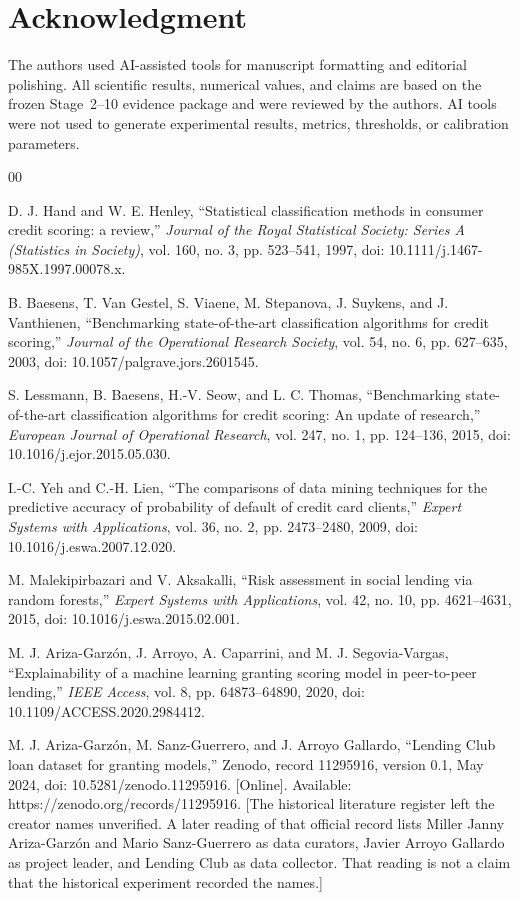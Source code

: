 \documentclass{ieeeaccess}
\begin{document}
\section*{Acknowledgment}
The authors used AI-assisted tools for manuscript formatting and editorial polishing.
All scientific results, numerical values, and claims are based on the frozen Stage~2--10 evidence package and were reviewed by the authors.
AI tools were not used to generate experimental results, metrics, thresholds, or calibration parameters.

\begin{thebibliography}{00}

 D. J. Hand and W. E. Henley, ``Statistical classification methods in consumer credit scoring: a review,'' \emph{Journal of the Royal Statistical Society: Series A (Statistics in Society)}, vol. 160, no. 3, pp. 523--541, 1997, doi: 10.1111/j.1467-985X.1997.00078.x.

 B. Baesens, T. Van Gestel, S. Viaene, M. Stepanova, J. Suykens, and J. Vanthienen, ``Benchmarking state-of-the-art classification algorithms for credit scoring,'' \emph{Journal of the Operational Research Society}, vol. 54, no. 6, pp. 627--635, 2003, doi: 10.1057/palgrave.jors.2601545.

 S. Lessmann, B. Baesens, H.-V. Seow, and L. C. Thomas, ``Benchmarking state-of-the-art classification algorithms for credit scoring: An update of research,'' \emph{European Journal of Operational Research}, vol. 247, no. 1, pp. 124--136, 2015, doi: 10.1016/j.ejor.2015.05.030.

 I.-C. Yeh and C.-H. Lien, ``The comparisons of data mining techniques for the predictive accuracy of probability of default of credit card clients,'' \emph{Expert Systems with Applications}, vol. 36, no. 2, pp. 2473--2480, 2009, doi: 10.1016/j.eswa.2007.12.020.

 M. Malekipirbazari and V. Aksakalli, ``Risk assessment in social lending via random forests,'' \emph{Expert Systems with Applications}, vol. 42, no. 10, pp. 4621--4631, 2015, doi: 10.1016/j.eswa.2015.02.001.

 M. J. Ariza-Garzón, J. Arroyo, A. Caparrini, and M. J. Segovia-Vargas, ``Explainability of a machine learning granting scoring model in peer-to-peer lending,'' \emph{IEEE Access}, vol. 8, pp. 64873--64890, 2020, doi: 10.1109/ACCESS.2020.2984412.

 M. J. Ariza-Garz\'on, M. Sanz-Guerrero, and J. Arroyo Gallardo, ``Lending Club loan dataset for granting models,'' Zenodo, record 11295916, version 0.1, May 2024, doi: 10.5281/zenodo.11295916. [Online]. Available: https://zenodo.org/records/11295916. [The historical literature register left the creator names unverified. A later reading of that official record lists Miller Janny Ariza-Garz\'on and Mario Sanz-Guerrero as data curators, Javier Arroyo Gallardo as project leader, and Lending Club as data collector. That reading is not a claim that the historical experiment recorded the names.]


\end{thebibliography}
\end{document}
